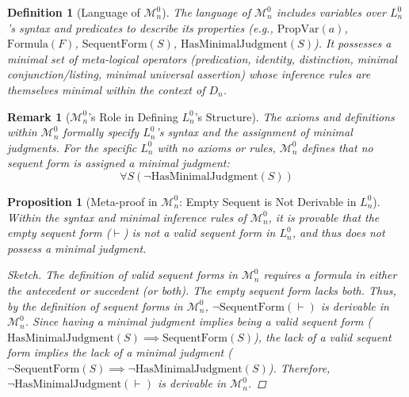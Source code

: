\documentclass{article}
\newtheorem{definition}{Definition}[section] %
\newtheorem{proposition}{Proposition}[section] %
\newtheorem{remark}{Remark}[section] %
\begin{document}
																																																			\begin{definition}[Language of $\mathcal{M}^0_n$]
																																																				The language of $\mathcal{M}^0_n$ includes variables over $L^0_n$'s syntax and predicates to describe its properties (e.g., $\text{PropVar}(a)$, $\text{Formula}(F)$, $\text{SequentForm}(S)$, $\text{HasMinimalJudgment}(S)$). It possesses a minimal set of meta-logical operators (predication, identity, distinction, minimal conjunction/listing, minimal universal assertion) whose inference rules are themselves minimal within the context of $D_n$.
																																																				\end{definition}
																																																					
																																																					\begin{remark}[$\mathcal{M}^0_n$'s Role in Defining $L^0_n$'s Structure]
																																																						The axioms and definitions within $\mathcal{M}^0_n$ formally specify $L^0_n$'s syntax and the assignment of minimal judgments. For the specific $L^0_n$ with no axioms or rules, $\mathcal{M}^0_n$ defines that no sequent form is assigned a minimal judgment:
																																																						$$\forall S (\neg \text{HasMinimalJudgment}(S))$$
																																																						\end{remark}
																																																							
																																																							\begin{proposition}[Meta-proof in $\mathcal{M}^0_n$: Empty Sequent is Not Derivable in $L^0_n$]
																																																								Within the syntax and minimal inference rules of $\mathcal{M}^0_n$, it is provable that the empty sequent form ($\vdash$) is not a valid sequent form in $L^0_n$, and thus does not possess a minimal judgment.
																																																								\begin{proof}[Sketch]
																																																									The definition of valid sequent forms in $\mathcal{M}^0_n$ requires a formula in either the antecedent or succedent (or both). The empty sequent form lacks both. Thus, by the definition of sequent forms in $\mathcal{M}^0_n$, $\neg \text{SequentForm}(\vdash)$ is derivable in $\mathcal{M}^0_n$. Since having a minimal judgment implies being a valid sequent form ($\text{HasMinimalJudgment}(S) \implies \text{SequentForm}(S)$), the lack of a valid sequent form implies the lack of a minimal judgment ($\neg \text{SequentForm}(S) \implies \neg \text{HasMinimalJudgment}(S)$). Therefore, $\neg \text{HasMinimalJudgment}(\vdash)$ is derivable in $\mathcal{M}^0_n$.
																																																								\end{proof}
																																																								\end{proposition}
																																																									
\end{document}

